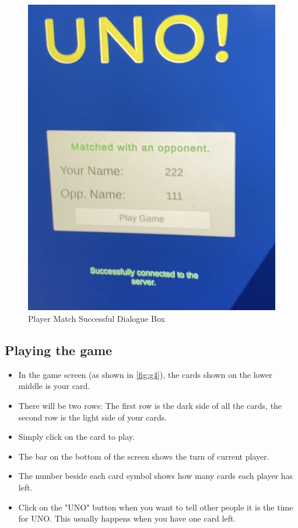 \documentclass[12pt, titlepage]{article}
\begin{document}
\begin{figure}[h]
    \centering
    \includegraphics[scale=0.3]{Match_msg.png}
    \caption{Player Match Successful Dialogue Box}
    \label{fig:g3}
\end{figure}


\subsection{Playing the game}
\begin{itemize}
    \item In the game screen (as shown in \autoref{fig:g4}), the cards shown on the lower middle is your card.
    \item There will be two rows: The first row is the dark side of all the cards, the second row is the light side of your cards.
    \item Simply click on the card to play.
    \item The bar on the bottom of the screen shows the turn of current player.
    \item The number beside each card symbol shows how many cards each player has left.
    \item Click on the "UNO" button when you want to tell other people it is the time for UNO. This usually happens when you have one card left.
\end{itemize}
\end{document}
